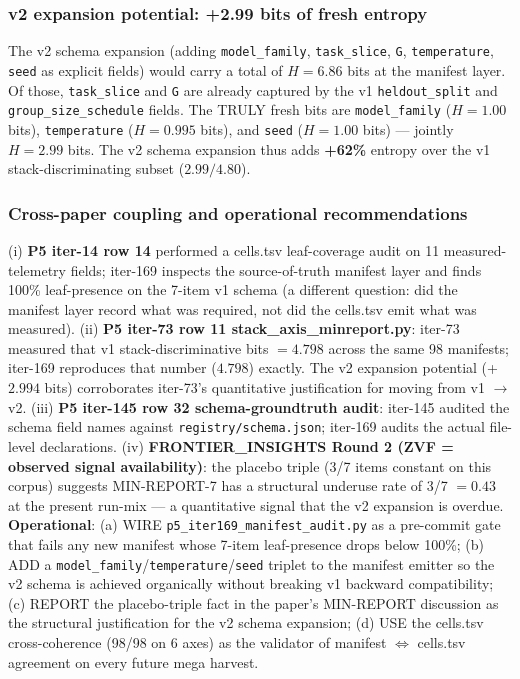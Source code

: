 \subsubsection{v2 expansion potential: +2.99 bits of fresh entropy}
\label{sec:p5-iter169-v2-expansion}

The v2 schema expansion (adding \texttt{model\_family}, \texttt{task\_slice}, \texttt{G}, \texttt{temperature}, \texttt{seed} as explicit fields) would carry a total of $H{=}6.86$ bits at the manifest layer. Of those, \texttt{task\_slice} and \texttt{G} are already captured by the v1 \texttt{heldout\_split} and \texttt{group\_size\_schedule} fields. The TRULY fresh bits are \texttt{model\_family} ($H{=}1.00$ bits), \texttt{temperature} ($H{=}0.995$ bits), and \texttt{seed} ($H{=}1.00$ bits) --- jointly $H{=}2.99$ bits. The v2 schema expansion thus adds \textbf{+62\%} entropy over the v1 stack-discriminating subset ($2.99 / 4.80$).

\subsubsection{Cross-paper coupling and operational recommendations}
\label{sec:p5-iter169-coupling}

(i) \textbf{P5 iter-14 row 14} performed a cells.tsv leaf-coverage audit on 11 measured-telemetry fields; iter-169 inspects the source-of-truth manifest layer and finds 100\% leaf-presence on the 7-item v1 schema (a different question: did the manifest layer record what was required, not did the cells.tsv emit what was measured). (ii) \textbf{P5 iter-73 row 11 stack\_axis\_minreport.py}: iter-73 measured that v1 stack-discriminative bits $= 4.798$ across the same 98 manifests; iter-169 reproduces that number ($4.798$) exactly. The v2 expansion potential (+$2.994$ bits) corroborates iter-73's quantitative justification for moving from v1 $\to$ v2. (iii) \textbf{P5 iter-145 row 32 schema-groundtruth audit}: iter-145 audited the schema field names against \texttt{registry/schema.json}; iter-169 audits the actual file-level declarations. (iv) \textbf{FRONTIER\_INSIGHTS Round 2 (ZVF = observed signal availability)}: the placebo triple (3/7 items constant on this corpus) suggests MIN-REPORT-7 has a structural underuse rate of 3/7 $= 0.43$ at the present run-mix --- a quantitative signal that the v2 expansion is overdue. \textbf{Operational}: (a) WIRE \texttt{p5\_iter169\_manifest\_audit.py} as a pre-commit gate that fails any new manifest whose 7-item leaf-presence drops below 100\%; (b) ADD a \texttt{model\_family}/\texttt{temperature}/\texttt{seed} triplet to the manifest emitter so the v2 schema is achieved organically without breaking v1 backward compatibility; (c) REPORT the placebo-triple fact in the paper's MIN-REPORT discussion as the structural justification for the v2 schema expansion; (d) USE the cells.tsv cross-coherence (98/98 on 6 axes) as the validator of manifest $\Leftrightarrow$ cells.tsv agreement on every future mega harvest.
